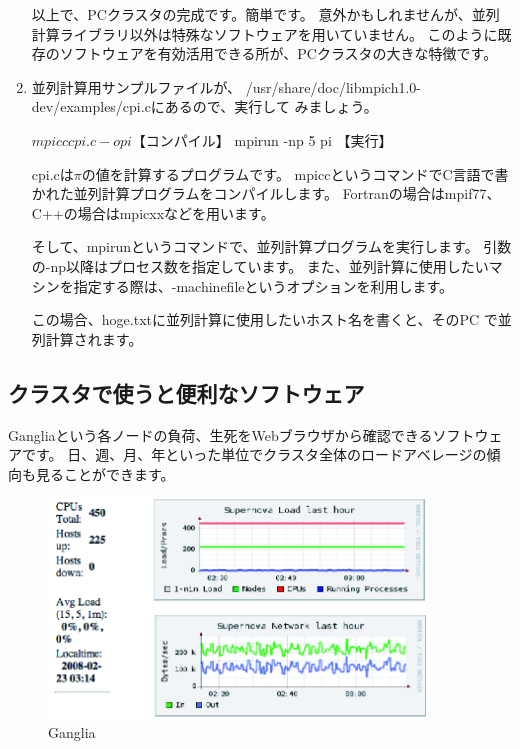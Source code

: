 \documentclass[mingoth,a4paper]{jsarticle}
\begin{document}
\begin{enumerate}
      以上で、PCクラスタの完成です。簡単です。
      意外かもしれませんが、並列計算ライブラリ以外は特殊なソフトウェアを用いていません。
      このように既存のソフトウェアを有効活用できる所が、PCクラスタの大きな特徴です。
 \item 並列計算用サンプルファイルが、
       /usr/share/doc/libmpich1.0-dev/examples/cpi.cにあるので、実行して
       みましょう。
\begin{commandline}
 $ mpicc cpi.c -o pi 【コンパイル】
 $ mpirun -np 5 pi   【実行】
\end{commandline}
       cpi.cは$\pi$の値を計算するプログラムです。
       mpiccというコマンドでC言語で書かれた並列計算プログラムをコンパイルします。
       Fortranの場合はmpif77、C++の場合はmpicxxなどを用います。

       そして、mpirunというコマンドで、並列計算プログラムを実行します。
       引数の-np以降はプロセス数を指定しています。
       また、並列計算に使用したいマシンを指定する際は、-machinefileというオプションを利用します。


       この場合、hoge.txtに並列計算に使用したいホスト名を書くと、そのPC
       で並列計算されます。
\end{enumerate}

\subsection{クラスタで使うと便利なソフトウェア}
Gangliaという各ノードの負荷、生死をWebブラウザから確認できるソフトウェアです。
日、週、月、年といった単位でクラスタ全体のロードアベレージの傾向も見ることができます。

\begin{figure}[htbp]
 \begin{center}
  \includegraphics[width=100mm]{image200802/ganglia.png}
  \caption{Ganglia}
  \label{fig:ganglia}
 \end{center}
\end{figure}
\end{document}
